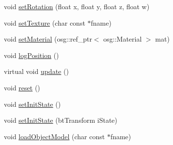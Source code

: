 \begin{DoxyCompactItemize}
\item 
void \mbox{\hyperlink{classbtosgObject_a4d21ca59b944fd26644db35d3e9ba67a}{set\+Rotation}} (float x, float y, float z, float w)
\item 
void \mbox{\hyperlink{classbtosgObject_aff54acbc7c66811efb0cf2838107a241}{set\+Texture}} (char const $\ast$fname)
\item 
void \mbox{\hyperlink{classbtosgObject_a6ab7b9e0553dab398b980637788b56a8}{set\+Material}} (osg\+::ref\+\_\+ptr$<$ osg\+::\+Material $>$ mat)
\item 
void \mbox{\hyperlink{classbtosgObject_acfd70fa6477c80fd7f29ad7ab9f4f067}{log\+Position}} ()
\item 
virtual void \mbox{\hyperlink{classbtosgObject_a342917817dfde62554f83da8e0d5110b}{update}} ()
\item 
void \mbox{\hyperlink{classbtosgObject_a93983f9180dd0672f8779cf2baa78580}{reset}} ()
\item 
void \mbox{\hyperlink{classbtosgObject_ad1508a0ce28cfac83e5f0ff6245f91b5}{set\+Init\+State}} ()
\item 
void \mbox{\hyperlink{classbtosgObject_a6ceb08e59ee95acaaef389ee198d2b56}{set\+Init\+State}} (bt\+Transform i\+State)
\item 
void \mbox{\hyperlink{classbtosgObject_a91838b8235579da178fcc06e6d3d47f3}{load\+Object\+Model}} (char const $\ast$fname)
\end{DoxyCompactItemize}
